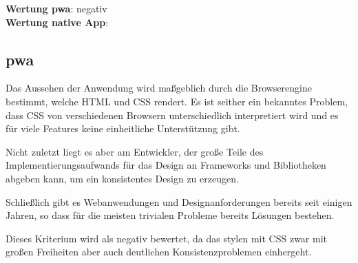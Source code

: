 \textbf{Wertung \ac{pwa}}: negativ\\
\textbf{Wertung native App}:  \\

\subsection{\ac{pwa}}
Das Aussehen der Anwendung wird maßgeblich durch die Browserengine bestimmt, welche HTML und CSS rendert. Es ist seither ein bekanntes Problem, dass CSS von verschiedenen Browsern unterschiedlich interpretiert wird und es für viele Features keine einheitliche Unterstützung gibt.

Nicht zuletzt liegt es aber am Entwickler, der große Teile des Implementierungsaufwands für das Design an Frameworks und Bibliotheken abgeben kann, um ein konsistentes Design zu erzeugen. 

Schließlich gibt es Webanwendungen und Designanforderungen bereits seit einigen Jahren, so dass für die meisten trivialen Probleme bereits Lösungen bestehen.

Dieses Kriterium wird als negativ bewertet, da das stylen mit CSS zwar mit großen Freiheiten aber auch deutlichen Konsistenzproblemen einhergeht.